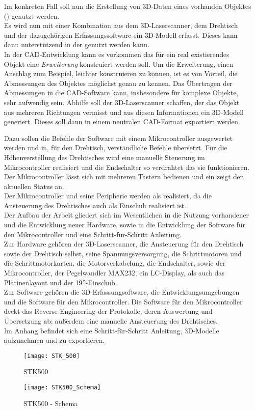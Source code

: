 Im konkreten Fall soll nun die Erstellung von 3D-Daten eines vorhanden Objektes () genutzt werden.\\
Es wird nun mit einer Kombination aus dem 3D-Laserscanner, dem Drehtisch und der dazugehörigen Erfassungssoftware ein 3D-Modell erfasst. Dieses kann dann unterstützend in der  genutzt werden kann.\\
In der CAD-Entwicklung kann es vorkommen das für ein real existierendes Objekt eine \textit{Erweiterung} konstruiert werden soll. Um die Erweiterung, einen Anschlag zum Beispiel, leichter konstruieren zu können, ist es von Vorteil, die Abmessungen des Objektes möglichst genau zu kennen. Das Übertragen der Abmessungen in die CAD-Software kann, insbesondere für komplexe Objekte, sehr aufwendig sein.
Abhilfe soll der 3D-Laserscanner schaffen, der das Objekt aus mehreren Richtungen vermisst und aus diesen Informationen ein 3D-Modell generiert. Dieses soll dann in einem neutralen CAD-Format  exportiert werden.









Dazu sollen die Befehle der Software mit einem Mikrocontroller ausgewertet werden und in, für den Drehtisch, verständliche Befehle übersetzt.
Für die Höhenverstellung des Drehtisches wird eine manuelle Steuerung im Mikrocontroller realisiert und die Endschalter so verdrahtet das sie funktionieren. \\
Der Mikrocontroller lässt sich mit mehreren Tastern bedienen und ein  zeigt den aktuellen Status an.\\
Der Mikrocontroller und seine Peripherie werden als  realisiert, da die Ansteuerung des Drehtisches auch als Einschub realisiert ist.\\

Der Aufbau der Arbeit gliedert sich im Wesentlichen in die Nutzung vorhandener und die Entwicklung neuer Hardware, sowie in die Entwicklung der Software für den Mikrocontroller und eine Schritt-für-Schritt Anleitung. \\
Zur Hardware gehören der 3D-Laserscanner, die Ansteuerung für den Drehtisch sowie der Drehtisch selbst, seine Spannungsversorgung, die Schrittmotoren und die Schrittmotorkarten, die Motorverkabelung, die Endschalter, sowie der Mikrocontroller, der Pegelwandler MAX232, ein LC-Display, als auch das Platinenlayout und der 19''-Einschub.\\
Zur Software gehören die 3D-Erfassungsoftware, die Entwicklungsumgebungen und die Software für den Mikrocontroller. Die Software für den Mikrocontroller deckt das Reverse-Engineering der Protokolle, deren Auswertung und Übersetzung ab; außerdem eine manuelle Ansteuerung des Drehtisches.\\
Im Anhang befindet sich eine Schritt-für-Schritt Anleitung, 3D-Modelle aufzunehmen und zu exportieren.


\begin{figure}[htb]
\centering
\texttt{[image: STK\_500]}
\caption{STK500}
\label{fig:STK500}
\end{figure}
\begin{figure}[htb]
\centering
\texttt{[image: STK500\_Schema]}
\caption{STK500 - Schema}
\label{fig:STK500_Schema}
\end{figure}